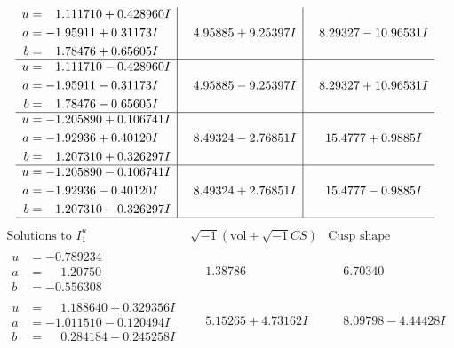\documentclass[1p]{elsarticle_modified}
\theoremstyle{definition}
\newcommand{\I}{\sqrt{-1}}
\begin{document}
$$\begin{array}{c|c|c}
\begin{aligned}
u &= \phantom{-}1.111710 + 0.428960 I \\
a &= -1.95911 + 0.31173 I \\
b &= \phantom{-}1.78476 + 0.65605 I\end{aligned}
 & \phantom{-}4.95885 + 9.25397 I & \phantom{-}8.29327 - 10.96531 I \\ \hline\begin{aligned}
u &= \phantom{-}1.111710 - 0.428960 I \\
a &= -1.95911 - 0.31173 I \\
b &= \phantom{-}1.78476 - 0.65605 I\end{aligned}
 & \phantom{-}4.95885 - 9.25397 I & \phantom{-}8.29327 + 10.96531 I \\ \hline\begin{aligned}
u &= -1.205890 + 0.106741 I \\
a &= -1.92936 + 0.40120 I \\
b &= \phantom{-}1.207310 + 0.326297 I\end{aligned}
 & \phantom{-}8.49324 - 2.76851 I & \phantom{-}15.4777 + 0.9885 I \\ \hline\begin{aligned}
u &= -1.205890 - 0.106741 I \\
a &= -1.92936 - 0.40120 I \\
b &= \phantom{-}1.207310 - 0.326297 I\end{aligned}
 & \phantom{-}8.49324 + 2.76851 I & \phantom{-}15.4777 - 0.9885 I\\
 \hline 
 \end{array}$$\newpage$$\begin{array}{c|c|c}  
\text{Solutions to }I^u_{1}& \I (\text{vol} + \sqrt{-1}CS) & \text{Cusp shape}\\
 \hline 
\begin{aligned}
u &= -0.789234\phantom{ +0.000000I} \\
a &= \phantom{-}1.20750\phantom{ +0.000000I} \\
b &= -0.556308\phantom{ +0.000000I}\end{aligned}
 & \phantom{-}1.38786\phantom{ +0.000000I} & \phantom{-}6.70340\phantom{ +0.000000I} \\ \hline\begin{aligned}
u &= \phantom{-}1.188640 + 0.329356 I \\
a &= -1.011510 - 0.120494 I \\
b &= \phantom{-}0.284184 - 0.245258 I\end{aligned}
 & \phantom{-}5.15265 + 4.73162 I & \phantom{-}8.09798 - 4.44428 I \\ \hline\begin{aligned}

\end{aligned}
\end{array}$$
\end{document}

